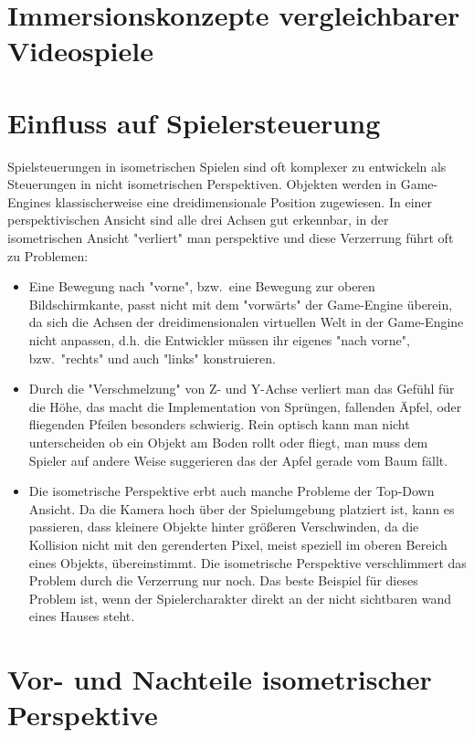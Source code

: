 \section{Immersionskonzepte vergleichbarer Videospiele}

\section{Einfluss auf Spielersteuerung}

Spielsteuerungen in isometrischen Spielen sind oft komplexer zu entwickeln als Steuerungen in nicht isometrischen Perspektiven. Objekten werden in Game-Engines klassischerweise eine dreidimensionale Position zugewiesen. In einer perspektivischen Ansicht sind alle drei Achsen gut erkennbar, in der isometrischen Ansicht "verliert" man perspektive und diese Verzerrung führt oft zu Problemen:
\begin{itemize}
	\item Eine Bewegung nach "vorne", bzw.\ eine Bewegung zur oberen Bildschirmkante, passt nicht mit dem "vorwärts" der Game-Engine überein, da sich die Achsen der dreidimensionalen virtuellen Welt in der Game-Engine nicht anpassen, d.h. die Entwickler müssen ihr eigenes "nach vorne", bzw.\ "rechts" und auch "links" konstruieren.
	\item Durch die "Verschmelzung" von Z- und Y-Achse verliert man das Gefühl für die Höhe, das macht die Implementation von Sprüngen, fallenden Äpfel, oder fliegenden Pfeilen besonders schwierig. Rein optisch kann man nicht unterscheiden ob ein Objekt am Boden rollt oder fliegt, man muss dem Spieler auf andere Weise suggerieren das der Apfel gerade vom Baum fällt.
	\item Die isometrische Perspektive erbt auch manche Probleme der Top-Down Ansicht. Da die Kamera hoch über der Spielumgebung platziert ist, kann es passieren, dass kleinere Objekte hinter größeren Verschwinden, da die Kollision nicht mit den gerenderten Pixel, meist speziell im oberen Bereich eines Objekts, übereinstimmt. Die isometrische Perspektive verschlimmert das Problem durch die Verzerrung nur noch. Das beste Beispiel für dieses Problem ist, wenn der Spielercharakter direkt an der nicht sichtbaren wand eines Hauses steht.
\end{itemize}

\section{Vor- und Nachteile isometrischer Perspektive}  

